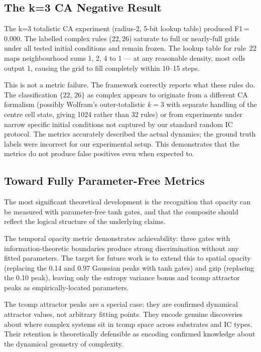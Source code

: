 \documentclass[12pt,a4paper]{article}
\begin{document}
\subsection{The k=3 CA Negative Result}

The k=3 totalistic CA experiment (radius-2, 5-bit lookup table)
produced F1\,=\,0.000.
The labelled complex rules ({22,\,26}) saturate to full or nearly-full
grids under all tested initial conditions and remain frozen.
The lookup table for rule~22 maps neighbourhood sums 1, 2, 4 to 1 ---
at any reasonable density, most cells output 1, causing the grid to
fill completely within 10--15 steps.

This is not a metric failure.
The framework correctly reports what these rules do.
The classification $\{22,\,26\}$ as complex appears to originate from
a different CA formalism (possibly Wolfram's outer-totalistic $k=3$
with separate handling of the centre cell state, giving 1024 rather
than 32 rules) or from experiments under narrow specific initial
conditions not captured by our standard random IC protocol.
The metrics accurately described the actual dynamics; the ground truth
labels were incorrect for our experimental setup.
This demonstrates that the metrics do not produce false positives even
when expected to.

\subsection{Toward Fully Parameter-Free Metrics}

The most significant theoretical development is the recognition that
opacity can be measured with parameter-free tanh gates, and that the
composite should reflect the logical structure of the underlying
claims.

The temporal opacity metric demonstrates achievability: three gates
with information-theoretic boundaries produce strong discrimination
without any fitted parameters.
The target for future work is to extend this to spatial opacity
(replacing the 0.14 and 0.97 Gaussian peaks with tanh gates) and
gzip (replacing the 0.10 peak), leaving only the entropy variance
bonus and tcomp attractor peaks as empirically-located parameters.

The tcomp attractor peaks are a special case: they are confirmed
dynamical attractor values, not arbitrary fitting points.
They encode genuine discoveries about where complex systems sit in
tcomp space across substrates and IC types.
Their retention is theoretically defensible as encoding confirmed
knowledge about the dynamical geometry of complexity.
\end{document}
